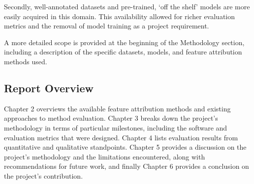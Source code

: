 \documentclass[main]{subfiles}
\begin{document}
Secondly, well-annotated datasets and pre-trained, `off the shelf' models are more easily acquired in this domain. This availability allowed for richer evaluation metrics and the removal of model training as a project requirement.

A more detailed scope is provided at the beginning of the Methodology section, including a description of the specific datasets, models, and feature attribution methods used.


\subsection*{Report Overview}

Chapter 2 overviews the available feature attribution methods and existing approaches to method evaluation. Chapter 3 breaks down the project's methodology in terms of particular milestones, including the software and evaluation metrics that were designed. Chapter 4 lists evaluation results from quantitative and qualitative standpoints. Chapter 5 provides a discussion on the project's methodology and the limitations encountered, along with recommendations for future work, and finally Chapter 6 provides a conclusion on the project's contribution.
\end{document}
